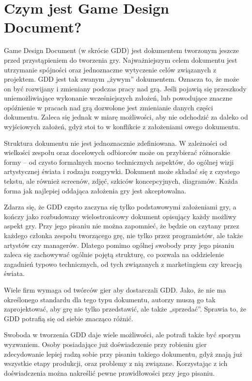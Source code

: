 \documentclass[brudnopis]{xmgr}
\begin{document}
\chapter{Czym jest Game Design Document?}

Game Design Document (w skrócie GDD) jest dokumentem tworzonym jeszcze przed przystąpieniem do tworzenia gry. Najważniejszym celem dokumentu jest utrzymanie spójności oraz jednoznaczne wytyczenie celów związanych z projektem. GDD jest tak zwanym „żywym” dokumentem. Oznacza to, że może on być rozwijany i zmieniany podczas pracy nad grą. Jeśli pojawią się przeszkody uniemożliwiające wykonanie wcześniejszych założeń, lub powodujące znaczne opóźnienie w pracach nad grą dozwolone jest zmienianie danych części dokumentu. Zaleca się jednak w miarę możliwości, aby nie odchodzić za daleko od wyjściowych założeń, gdyż stoi to w konflikcie z założeniami owego dokumentu. 

Struktura dokumentu nie jest jednoznacznie zdefiniowana. W zależności od wielkości zespołu oraz docelowych odbiorców może on przybierać różnorakie formy – od czysto formalnych mocno technicznych aspektów, do ogólnej wizji artystycznej świata i rodzaju rozgrywki. Dokument może składać się z czystego tekstu, ale również screenów, zdjęć, szkiców koncepcyjnych, diagramów. Każda forma jak najlepiej oddająca założenia gry jest akceptowalna. 

Zdarza się, że GDD często zaczyna się tylko podstawowymi założeniami gry, a kończy jako rozbudowany wielostronicowy dokument opisujący każdy możliwy aspekt gry. Przy jego pisaniu nie można zapomnieć, że   będzie on czytany przez każdego członka zespołu tworzącego grę, nie tylko przez programistów, ale także artystów czy managerów. Dlatego pomimo ogólnej swobody przy jego pisaniu zaleca się zachowywać ogólnie pojętą strukturę, co pozwala na oddzielenie zagadnień typowo technicznych, od tych związanych z marketingiem czy kreacją świata. 

Wiele firm wymaga od twórców gier aby dostarczali GDD. Jako, że nie ma określonego standardu dla tego typu dokumentu, autorzy muszą go tak zaprojektować, aby grę nie tylko przedstawić, ale także „sprzedać”. Sprawia to, że GDD potrafią się od siebie znacząco różnić. 

Swoboda w tworzenia GDD daje wiele możliwości, ale potrafi także być sporym wyzwaniem. Osoby posiadające już doświadczenie przy robieniu gier zdecydowanie lepiej radzą sobie przy pisaniu takiego dokumentu, gdyż znają już wszystkie etapy produkcji, oraz problemy z nią związane. Korzystając z ich doświadczenia można nakreślić pewne prawidłowości przy jego pisaniu.
\end{document}
